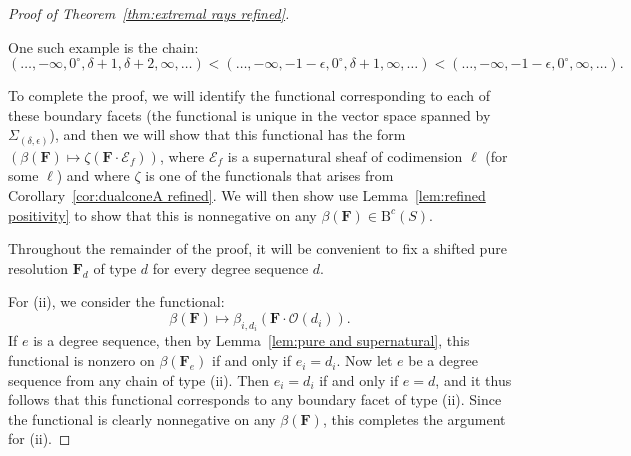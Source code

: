 \documentclass[12pt]{amsart}
\theoremstyle{definition}
\theoremstyle{remark}
\newcommand{\cc}{c}
\newcommand{\dd}{d}
\newcommand{\cO}{\mathcal{O}}
\newcommand{\cE}{\mathcal{E}}
\newcommand{\FF}{\mathbf{F}}
\newcommand{\zp}{\circ}
\newcommand{\BBQ}{\mathrm{B}}
\begin{document}
\begin{proof}[Proof of Theorem~\ref{thm:extremal rays refined}]
\begin{enumerate}[(i)]
%
One such example is the chain:
\[
(\dots,-\infty,0^\zp,\delta+1,\delta+2,\infty,\dots)<(\dots,-\infty,-1-\epsilon,0^\zp,\delta+1,\infty,\dots)<(\dots,-\infty,-1-\epsilon,0^\zp,\infty,\dots).
\]
\end{enumerate} 

To complete the proof, we will identify the functional corresponding to each of these boundary facets (the functional is unique in the vector space spanned by $\Sigma_{(\delta,\epsilon)}$), and then we will show that this functional has the form $(\beta(\FF)\mapsto \zeta(\FF\cdot \cE_f))$, where $\cE_f$ is a supernatural sheaf of codimension $\ell$ (for some $\ell$) and where $\zeta$ is one of the functionals that arises from Corollary~\ref{cor:dualconeA refined}.   We will then show use Lemma~\ref{lem:refined positivity} to show that this is nonnegative on any $\beta(\FF)\in \BBQ^{\cc}(S)$.


Throughout the remainder of the proof, it will be convenient to fix a shifted pure resolution $\FF_{\dd}$ of type $\dd$ for every  degree sequence $\dd$.


For (ii), we consider the functional:
\[
\beta(\FF)\mapsto \beta_{i,{d_i}}(\FF\cdot \cO(d_i)).
\]
If $e$ is a degree sequence, then by Lemma~\ref{lem:pure and supernatural}, this functional is nonzero on $\beta(\FF_e)$ if and only if $e_i=d_i$.
Now let $e$ be a degree sequence from any chain of type (ii).  Then $e_i=d_i$ if and only if $e=d$, and it thus follows that this functional corresponds to any boundary facet of type (ii).  Since the functional is clearly nonnegative on any $\beta(\FF)$, this completes the argument for (ii).


\end{proof}
\end{document}
